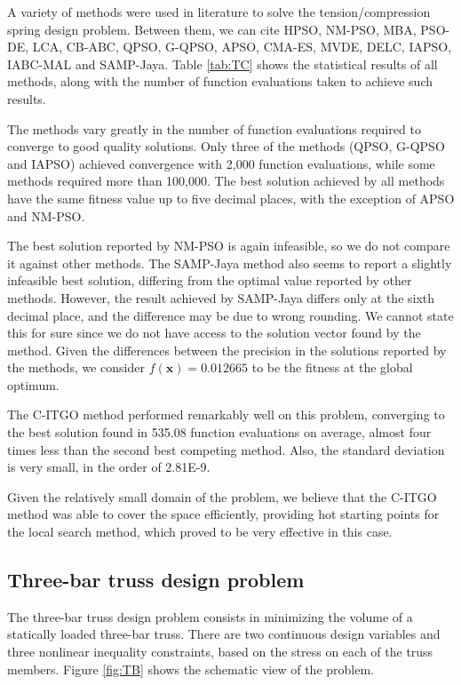A variety of methods were used in literature to solve the tension/compression spring design problem. Between them, we can cite HPSO, NM-PSO, MBA, PSO-DE, LCA, CB-ABC, QPSO, G-QPSO, APSO, CMA-ES, MVDE, DELC, IAPSO, IABC-MAL and SAMP-Jaya. Table \ref{tab:TC} shows the statistical results of all methods, along with the number of function evaluations taken to achieve such results.




The methods vary greatly in the number of function evaluations required to converge to good quality solutions. Only three of the methods (QPSO, G-QPSO and IAPSO) achieved convergence with 2,000 function evaluations, while some methods required more than 100,000. The best solution achieved by all methods have the same fitness value up to five decimal places, with the exception of APSO and NM-PSO.
 
The best solution reported by NM-PSO is again infeasible, so we do not compare it against other methods. The SAMP-Jaya method also seems to report a slightly infeasible best solution, differing from the optimal value reported by other methods. However, the result achieved by SAMP-Jaya differs only at the sixth decimal place, and the difference may be due to wrong rounding. We cannot state this for sure since we do not have access to the solution vector found by the method. Given the differences between the precision in the solutions reported by the methods, we consider $f(\bm{x}) = 0.012665$ to be the fitness at the global optimum.

The C-ITGO method performed remarkably well on this problem, converging to the best solution found in 535.08 function evaluations on average, almost four times less than the second best competing method. Also, the standard deviation is very small, in the order of 2.81E-9. 

Given the relatively small domain of the problem, we believe that the C-ITGO method was able to cover the space efficiently, providing hot starting points for the local search method, which proved to be very effective in this case.




\subsection{Three-bar truss design problem}

The three-bar truss design problem \citep{TB} consists in minimizing the volume of a statically loaded three-bar truss. There are two continuous design variables and three nonlinear inequality constraints, based on the stress on each of the truss members. Figure \ref{fig:TB} shows the schematic view of the problem.

